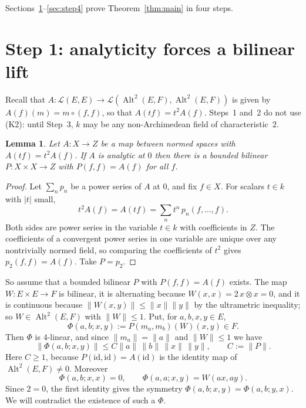 \documentclass[11pt]{amsart}
\newtheorem{lemma}[theorem]{Lemma}
\theoremstyle{remark}
\newcommand{\kk}{k}
\newcommand{\cL}{\mathcal{L}}
\newcommand{\Alt}{\operatorname{Alt}}
\newcommand{\abs}[1]{\lvert #1\rvert}
\newcommand{\norm}[1]{\lVert #1\rVert}
\newcommand{\1}{\mathbf{1}}
\begin{document}
Sections~\ref{sec:step1}--\ref{sec:step4} prove Theorem~\ref{thm:main} in four steps.

\section{Step 1: analyticity forces a bilinear lift}\label{sec:step1}
Recall that $A\colon\cL(E,E)\to\cL(\Alt^2(E,F),\Alt^2(E,F))$ is given by $A(f)(m)=m\circ(f,f)$, so that $A(tf)=t^2A(f)$.
Steps~1 and~2 do not use \textup{(K2)}: until Step~3, $\kk$ may be any non-Archimedean field of characteristic~$2$.

\begin{lemma}\label{lem:lift}
Let $A\colon X\to Z$ be a map between normed spaces with $A(tf)=t^2A(f)$. If $A$ is analytic at $0$ then there is a bounded
bilinear $P\colon X\times X\to Z$ with $P(f,f)=A(f)$ for all $f$.
\end{lemma}
\begin{proof}
Let $\sum_np_n$ be a power series of $A$ at $0$, and fix $f\in X$. For scalars $t\in\kk$ with $\abs t$ small,
\[
t^2A(f)=A(tf)=\sum_nt^n\,p_n(f,\dots,f).
\]
Both sides are power series in the variable $t\in\kk$ with coefficients in $Z$. The coefficients of a convergent power
series in one variable are unique over any nontrivially normed field, so comparing the coefficients of $t^2$ gives
$p_2(f,f)=A(f)$. Take $P=p_2$.
\end{proof}

So assume that a bounded bilinear $P$ with $P(f,f)=A(f)$ exists. The map $W\colon E\times E\to F$ is bilinear, it is
alternating because $W(x,x)=2\,x\otimes x=0$, and it is continuous because $\norm{W(x,y)}\le\norm x\norm y$ by the
ultrametric inequality; so
$W\in\Alt^2(E,F)$ with $\norm W\le1$. Put, for $a,b,x,y\in E$,
\[
\Phi(a,b;x,y):=P(m_a,m_b)(W)(x,y)\in F .
\]
Then $\Phi$ is $4$-linear, and since $\norm{m_a}=\norm a$ and $\norm W\le1$ we have
\[
\norm{\Phi(a,b;x,y)}\le C\norm a\,\norm b\,\norm x\,\norm y,\qquad C:=\norm P.
\]
Here $C\ge1$, because $P(\mathrm{id},\mathrm{id})=A(\mathrm{id})$ is the identity map of $\Alt^2(E,F)\ne0$.
Moreover
\begin{equation}\label{eq:Phi}
\Phi(a,b;x,x)=0,\qquad \Phi(a,a;x,y)=W(ax,ay).
\end{equation}
Since $2=0$, the first identity gives the symmetry $\Phi(a,b;x,y)=\Phi(a,b;y,x)$. We will contradict the existence of such
a $\Phi$.
\end{document}
